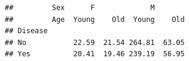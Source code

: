 \documentclass[11pt]{book}
\renewenvironment{knitrout}{\small\renewcommand{\baselinestretch}{.85}}{} %
\begin{document}
\begin{knitrout}
\color{fgcolor}\begin{kframe}
\begin{alltt}
 \hlkwb{<-} \hlstd{(}\hlopt{~}\hlopt{*} \hlopt{+}   \hlstd{=}\hlstd{)}
 \hlkwb{<-} \hlstd{(}
\hlopt{+} \hlopt{~} 
\end{alltt}
\begin{verbatim}
##         Sex      F             M       
##         Age  Young    Old  Young    Old
## Disease                                
## No           22.59  21.54 264.81  63.05
## Yes          20.41  19.46 239.19  56.95
\end{verbatim}
\end{kframe}
\end{knitrout}
\end{document}
